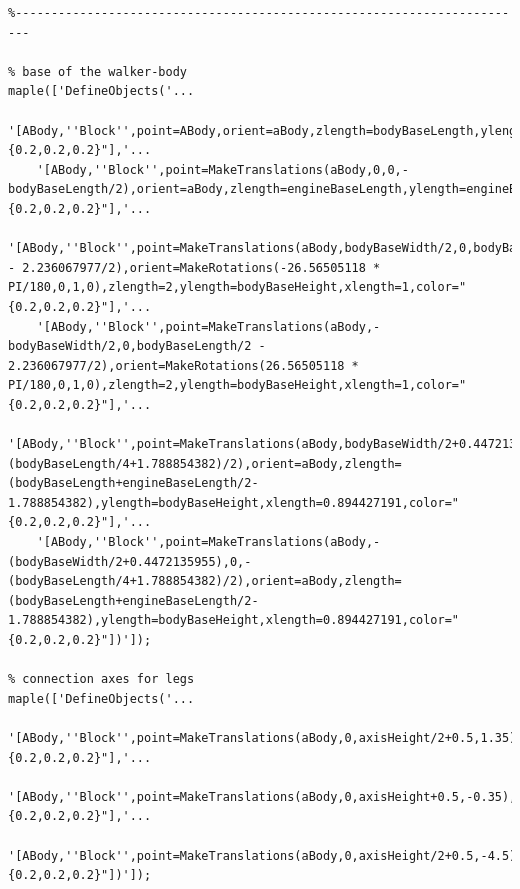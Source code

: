\documentclass{article}
\begin{document}
\begin{verbatim}
%------------------------------------------------------------------------

% base of the walker-body
maple(['DefineObjects('...
	'[ABody,''Block'',point=ABody,orient=aBody,zlength=bodyBaseLength,ylength=bodyBaseHeight,xlength=bodyBaseWidth,color="{0.2,0.2,0.2}"],'...
	'[ABody,''Block'',point=MakeTranslations(aBody,0,0,-bodyBaseLength/2),orient=aBody,zlength=engineBaseLength,ylength=engineBaseHeight,xlength=engineBaseWidth,color="{0.2,0.2,0.2}"],'...
	'[ABody,''Block'',point=MakeTranslations(aBody,bodyBaseWidth/2,0,bodyBaseLength/2 - 2.236067977/2),orient=MakeRotations(-26.56505118 * PI/180,0,1,0),zlength=2,ylength=bodyBaseHeight,xlength=1,color="{0.2,0.2,0.2}"],'...
	'[ABody,''Block'',point=MakeTranslations(aBody,-bodyBaseWidth/2,0,bodyBaseLength/2 - 2.236067977/2),orient=MakeRotations(26.56505118 * PI/180,0,1,0),zlength=2,ylength=bodyBaseHeight,xlength=1,color="{0.2,0.2,0.2}"],'...
	'[ABody,''Block'',point=MakeTranslations(aBody,bodyBaseWidth/2+0.4472135955,0,-(bodyBaseLength/4+1.788854382)/2),orient=aBody,zlength=(bodyBaseLength+engineBaseLength/2-1.788854382),ylength=bodyBaseHeight,xlength=0.894427191,color="{0.2,0.2,0.2}"],'...
	'[ABody,''Block'',point=MakeTranslations(aBody,-(bodyBaseWidth/2+0.4472135955),0,-(bodyBaseLength/4+1.788854382)/2),orient=aBody,zlength=(bodyBaseLength+engineBaseLength/2-1.788854382),ylength=bodyBaseHeight,xlength=0.894427191,color="{0.2,0.2,0.2}"])']);

% connection axes for legs
maple(['DefineObjects('...
	'[ABody,''Block'',point=MakeTranslations(aBody,0,axisHeight/2+0.5,1.35),orient=MakeRotations(PI/2,0,1,0),zlength=axisLength,ylength=axisHeight,xlength=axisWidth,color="{0.2,0.2,0.2}"],'...
	'[ABody,''Block'',point=MakeTranslations(aBody,0,axisHeight+0.5,-0.35),orient=MakeRotations(PI/2,0,1,0),zlength=axisLength,ylength=axisHeight,xlength=axisWidth,color="{0.2,0.2,0.2}"],'...
	'[ABody,''Block'',point=MakeTranslations(aBody,0,axisHeight/2+0.5,-4.5),orient=MakeRotations(PI/2,0,1,0),zlength=axisLength,ylength=axisHeight,xlength=axisWidth,color="{0.2,0.2,0.2}"])']);


\end{verbatim}
\end{document}

